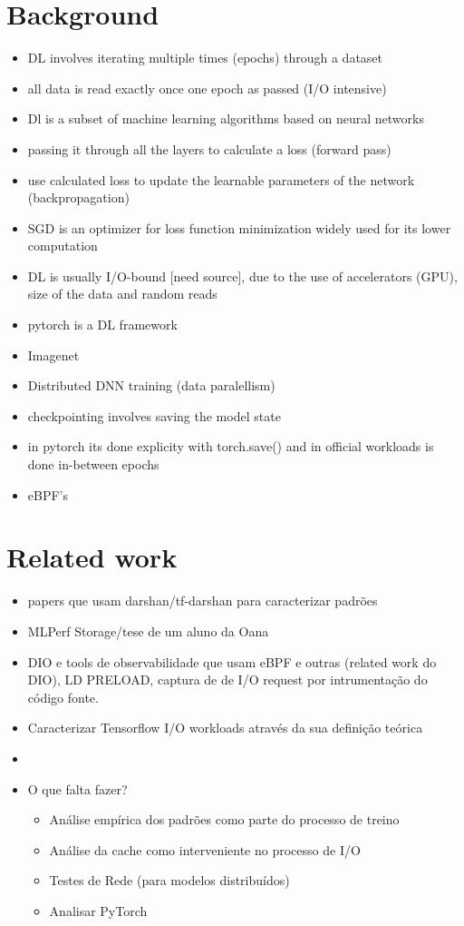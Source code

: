\documentclass[conference]{IEEEtran}
\begin{document}
\section{Background}

\begin{itemize}
    \item DL involves iterating multiple times (epochs) through a dataset
    \item all data is read exactly once one epoch as passed (I/O intensive)
    \item Dl is a subset of machine learning algorithms based on neural networks
    \item passing it through all the layers to calculate a loss (forward pass)
    \item use calculated loss to update the learnable parameters of the network (backpropagation)
    \item SGD is an optimizer for loss function minimization widely used for its lower computation  
    \item DL is usually I/O-bound [need source], due to the use of accelerators (GPU), size of the data and random reads
    \item pytorch is a DL framework
    \item Imagenet
    \item Distributed DNN training (data paralellism)
    \item checkpointing involves saving the model state
    \item in pytorch its done explicity with torch.save() and in official workloads is done in-between epochs
    \item eBPF's
\end{itemize}

\section{Related work}

\begin{itemize}
    \item papers que usam darshan/tf-darshan para caracterizar padrões
    \item MLPerf Storage/tese de um aluno da Oana
    \item DIO e tools de observabilidade que usam eBPF e outras (related work do DIO), LD PRELOAD, captura de de I/O request por intrumentação do código fonte.
    \item Caracterizar Tensorflow I/O workloads através da sua definição teórica \cite{8638422}
    \item 
    \item O que falta fazer?
    \begin{itemize}
        \item Análise empírica dos padrões como parte do processo de treino 
        \item Análise da cache como interveniente no processo de I/O
        \item Testes de Rede (para modelos distribuídos)
        \item Analisar PyTorch
    \end{itemize}
\end{itemize}
\end{document}
